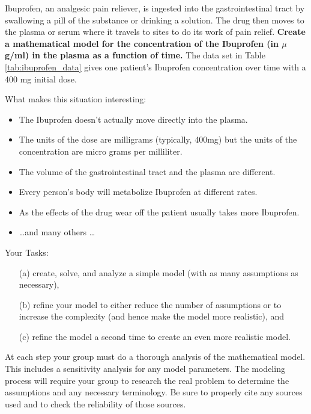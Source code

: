 \begin{problem}
Ibuprofen, an analgesic pain reliever, is ingested into the gastrointestinal tract by
swallowing a pill of the substance or drinking a solution.  The drug then moves to the
plasma or serum where it travels to sites to do its work of pain relief.  {\bf Create a
    mathematical model for the concentration of the Ibuprofen (in $\mu$g/ml) in the plasma
as a function of time.} The data set in Table \ref{tab:ibuprofen_data} gives one patient's Ibuprofen concentration over time
with a 400 mg initial dose.

What makes this situation interesting:
\begin{itemize}
    \item The Ibuprofen doesn't actually move directly into the plasma.
    \item The units of the dose are milligrams (typically, 400mg) but the units of the
        concentration are micro grams per milliliter.
    \item The volume of the gastrointestinal tract and the plasma are different.
    \item Every person's body will metabolize Ibuprofen at different rates.
    \item As the effects of the drug wear off the patient usually takes more Ibuprofen.
    \item \ldots and many others \ldots
\end{itemize}
Your Tasks:
\begin{itemize}
    \item[(a)]create, solve, and analyze a simple model (with as many assumptions as
        necessary),
    \item[(b)] refine your model to either reduce the number of assumptions or to increase the
        complexity (and hence make the model more realistic), and
    \item[(c)] refine the model a second time to create an even more realistic model.
\end{itemize}
At each step your group must do a thorough analysis of the mathematical model.  This
includes a sensitivity analysis for any model parameters. The modeling process will
require your group to research the real problem to determine the assumptions and any
necessary terminology. Be sure to properly cite any sources used and to check the
reliability of those sources.
\end{problem}


